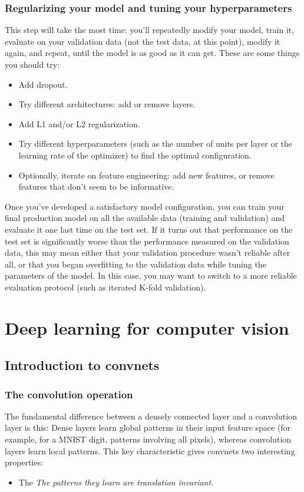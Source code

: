 \documentclass{article}
\numberwithin{equation}{section} %
\begin{document}
\subsubsection{Regularizing your model and tuning your hyperparameters}

This step will take the most time: you’ll repeatedly modify your model, train it, evaluate on your validation data (not the test data, at this point), modify it again, and repeat, until the model is as good as it can get. These are some things you should try:

\begin{itemize}
	\item Add dropout.
	\item Try different architectures: add or remove layers.
	\item Add L1 and/or L2 regularization.
	\item Try different hyperparameters (such as the number of units per layer or the learning rate of the optimizer) to find the optimal configuration.
	\item Optionally, iterate on feature engineering: add new features, or remove features that don’t seem to be informative.
\end{itemize}

Once you’ve developed a satisfactory model configuration, you can train your final
production model on all the available data (training and validation) and evaluate it
one last time on the test set. If it turns out that performance on the test set is significantly worse than the performance measured on the validation data, this may mean either that your validation procedure wasn’t reliable after all, or that you began overfitting to the validation data while tuning the parameters of the model. In this case, you may want to switch to a more reliable evaluation protocol (such as iterated K-fold validation).


\newpage

\section{Deep learning for computer vision}

\subsection{Introduction to convnets}

\subsubsection{The convolution operation}

The fundamental difference between a densely connected layer and a convolution
layer is this: Dense layers learn global patterns in their input feature space (for example, for a MNIST digit, patterns involving all pixels), whereas convolution layers learn local patterns. This key characteristic gives convnets two interesting properties:

\begin{itemize}
	\item The \textit{The patterns they learn are translation invariant.}
\end{itemize}
\end{document}
